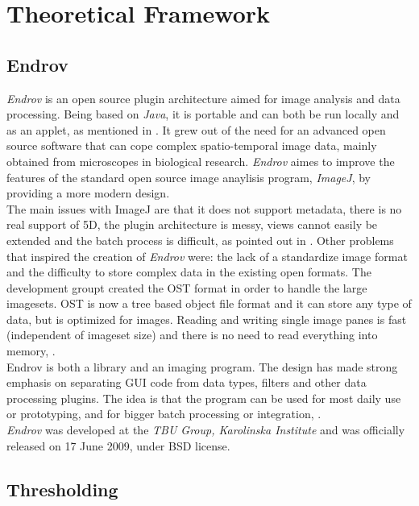 \cleardoublepage
\chapter{Theoretical Framework}
\label{sec:dev}

\section{Endrov}
\label{sec:endrov}

\emph{Endrov} is an open source plugin architecture aimed for image analysis and data processing.
Being based on \emph{Java}, it is portable and can both be run locally and as an applet, as mentioned
in \cite{web:endrov}. It grew out of the need for an advanced open source software 
that can cope complex spatio-temporal image data, mainly obtained from microscopes in 
biological research. \emph{Endrov} aimes to improve the features of the standard 
open source image anaylisis program, \emph{ImageJ}, by providing a more modern design.\\
The main issues with ImageJ are that it does not support metadata, there is no real support of 5D, 
the plugin architecture is messy, views cannot easily be extended and the batch 
process is difficult, as pointed out in \cite{web:endrovhome}.
Other problems that inspired the creation of \emph{Endrov} were: the lack of a standardize
image format and the difficulty to store complex data in the existing open formats.
The development groupt created the OST format in order
to handle the large imagesets. OST is now a tree based object file format and it can store any 
type of data, but is optimized for images. 
Reading and writing single image panes is fast (independent of imageset size) 
and there is no need to read everything into memory, \cite{web:endrovhome}.\\

Endrov is both a library and an imaging program. The design has made strong emphasis on 
separating GUI code from data types, filters and other data processing plugins. 
The idea is that the program can be used for most daily use or prototyping, and for 
bigger batch processing or integration, \cite{web:endrov}.\\

\emph{Endrov} was developed at the \emph{TBU Group, Karolinska Institute} and was officially released 
on 17 June 2009, under BSD license.



\section{Thresholding}
\label{sec:thresholding}

